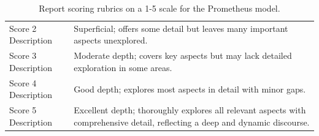 \documentclass[11pt]{article}
\begin{document}
\begin{table}
{\begin{tabular}{ll}
Score 2 Description  & Superficial; offers some detail but leaves many important aspects unexplored.                                                                    \\
Score 3 Description  & Moderate depth; covers key aspects but may lack detailed exploration in some areas.                                                   \\
Score 4 Description  & Good depth; explores most aspects in detail with minor gaps.                                                                   \\
Score 5 Description  & Excellent depth; thoroughly explores all relevant aspects with comprehensive detail, reflecting a deep and dynamic discourse.                               \\
\bottomrule
\end{tabular}

}
\caption{Report scoring rubrics on a 1-5 scale for the Prometheus model.}
\label{table:final_report_rubric}
\end{table}
\end{document}
